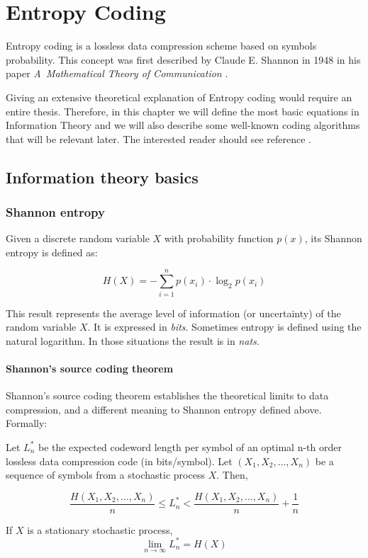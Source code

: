 \chapter{Entropy Coding}
Entropy coding is a lossless data compression scheme based on symbols probability. This concept was first described by Claude E. Shannon in 1948 in his paper \textit{A~Mathematical Theory of Communication} \parencite{Shannon1948}.

Giving an extensive theoretical explanation of Entropy coding would require an entire thesis. Therefore, in this chapter we will define the most basic equations in Information Theory and we will also describe some well-known coding algorithms that will be relevant later. The interested reader should see reference \parencite{cover}.

\section{Information theory basics}
\subsection{Shannon entropy}
Given a discrete random variable $X$ with probability function $p(x)$, its Shannon entropy is defined as:

\begin{equation}
H(X) = - \sum_{i=1}^{n} p(x_i) \cdot \log_2 p(x_i) 
\end{equation}

This result represents the average level of information (or uncertainty) of the random variable $X$. It is expressed in \textit{bits}. Sometimes entropy is defined using the natural logarithm. In those situations the result is in \textit{nats}.

\subsubsection{Shannon's source coding theorem}
Shannon's source coding theorem establishes the theoretical limits to data compression, and a different meaning to Shannon entropy defined above. Formally:

\begin{theorem}
Let $L_n^*$ be the expected codeword length per symbol of an optimal n-th order lossless data compression code (in bits/symbol). Let $(X_1, X_2, \dots, X_n )$ be a sequence of symbols from a stochastic process $X$. Then,

\begin{equation}
	\frac{H(X_1, X_2, \dots, X_n )}{n} \leq L_n^* < \frac{H(X_1, X_2, \dots, X_n )}{n} + \frac{1}{n}
\end{equation}

If $X$ is a stationary stochastic process,
\begin{equation}
	\lim_{n \to \infty} L_n^* = H(X)
\end{equation}
\end{theorem}

